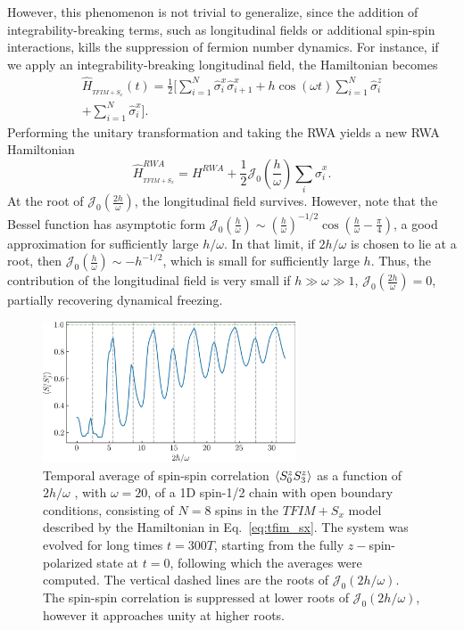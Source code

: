 \documentclass[%
reprint,
superscriptaddress,
amsmath,amssymb,
aps,
prb,
showkeys,
]{revtex4-2}
\begin{document}
However, this phenomenon is not trivial to generalize, since the addition of integrability-breaking terms, such as longitudinal fields or additional spin-spin interactions, kills the suppression of fermion number dynamics.  For instance, if we apply an integrability-breaking longitudinal field, the Hamiltonian becomes 
\begin{multline}
\hat{H}_{_{TFIM+S_{x}}}(t) =\frac12 \Big[\sum^N_{i=1}  \hat{\sigma}_{i}^{x} \hat{\sigma}_{i+1}^{x}+h \cos (\omega t) \sum^N_{i=1} \hat{\sigma}_{i}^{z}\\
+\sum^N_{i=1} \hat{\sigma}_{i}^{x}\Big].
\label{eq:tfim_sx}
\end{multline}	
Performing the unitary transformation and taking the RWA yields a new RWA Hamiltonian
\begin{equation}
	\hat{H}_{_{TFIM+S_{x}}}^{R W A}= H^{RWA}+\frac12 \mathcal{J}_{0}\left(\frac{h}{\omega}\right) \sum_i\hat{\sigma}^x_i.
	\label{eq:tfim_sx1}
\end{equation}
At the root of $\mathcal{J}_0\left(\frac{2h}{\omega}\right)$, the longitudinal field survives. However, note that the Bessel function has asymptotic form $\mathcal{J}_0\left(\frac{h}{\omega}\right)\sim \left(\frac{h}{\omega}\right)^{-1/2}\cos\left(\frac{h}{\omega}-\frac{\pi}{4}\right)$, a good approximation for sufficiently  large $h/\omega$. In that limit, if $2h/\omega$ is chosen to lie at a root, then $\mathcal{J}_0\left(\frac{h}{\omega}\right) \sim -h^{-1/2}$, which is small for sufficiently large $h$. Thus, the contribution of the longitudinal field is very small if $h\gg\omega\gg1$, $\mathcal{J}_0\left(\frac{2h}{\omega}\right)=0$, partially recovering dynamical freezing.
\begin{figure}[t!]
	\centering
	\includegraphics[width = 7.5cm]{corrN8sz0sz3avg_onlynn_tfim_sx.jpeg}
	\caption{Temporal average of spin-spin correlation $\expval{S^z_0 S^z_3}$ as a function of $2h/\omega$ , with $\omega=20$, of a 1D spin-1/2 chain with open boundary conditions, consisting of $N=8$ spins in the $TFIM+S_x$ model described by the Hamiltonian in Eq.~\ref{eq:tfim_sx}. The system was evolved for long times $t=300T$, starting from the fully $z-$spin-polarized state at $t=0$,  following which the averages were computed.  The  vertical dashed lines are the roots of $\mathcal{J}_0\left(2h/\omega\right)$. The spin-spin correlation is suppressed at lower roots  of $\mathcal{J}_0\left(2h/\omega\right)$, however it approaches unity at higher roots.}
	\label{fig:ipr:tfimsx}
\end{figure}
\end{document}
